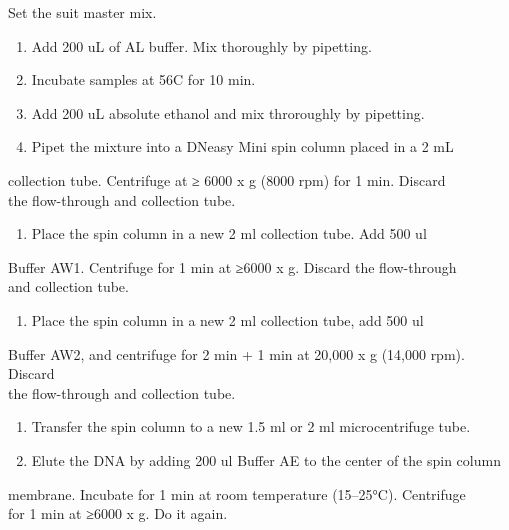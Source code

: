 \documentclass[11pt]{article}
\begin{document}
Set the suit master mix.\\

\begin{enumerate}
\item Add 200 uL of AL buffer. Mix thoroughly by pipetting.\\
\item Incubate samples at 56C for 10 min.\\
\item Add 200 uL absolute ethanol and mix throroughly by pipetting.\\
\item Pipet the mixture into a DNeasy Mini spin column placed in a 2 mL\\
\end{enumerate}
collection tube. Centrifuge at ≥ 6000 x g (8000 rpm) for 1 min. Discard\\
the flow-through and collection tube.\\
\begin{enumerate}
\item Place the spin column in a new 2 ml collection tube. Add 500 ul\\
\end{enumerate}
Buffer AW1. Centrifuge for 1 min at ≥6000 x g. Discard the flow-through\\
and collection tube.\\
\begin{enumerate}
\item Place the spin column in a new 2 ml collection tube, add 500 ul\\
\end{enumerate}
Buffer AW2, and centrifuge for 2 min + 1 min at 20,000 x g (14,000 rpm). Discard\\
the flow-through and collection tube.\\
\begin{enumerate}
\item Transfer the spin column to a new 1.5 ml or 2 ml microcentrifuge tube.\\
\item Elute the DNA by adding 200 ul Buffer AE to the center of the spin column\\
\end{enumerate}
membrane. Incubate for 1 min at room temperature (15–25°C). Centrifuge\\
for 1 min at ≥6000 x g. Do it again.\\
\end{document}
